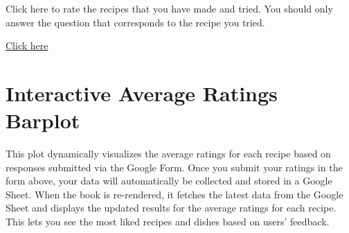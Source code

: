 \documentclass[
]{book}
\begin{document}
Click here to rate the recipes that you have made and tried. You should
only answer the question that corresponds to the recipe you tried.

\href{https://docs.google.com/forms/d/e/1FAIpQLScTyaAdakRAb1C2L7f3DaMqyd_4UnsrQWLYRXmMRr-td62CzQ/viewform?usp=sf_link}{Click
here}

\section*{Interactive Average Ratings
Barplot}\label{interactive-average-ratings-barplot}

This plot dynamically visualizes the average ratings for each recipe
based on responses submitted via the Google Form. Once you submit your
ratings in the form above, your data will automatically be collected and
stored in a Google Sheet. When the book is re-rendered, it fetches the
latest data from the Google Sheet and displays the updated results for
the average ratings for each recipe. This lets you see the most liked
recipes and dishes based on users' feedback.
\end{document}
